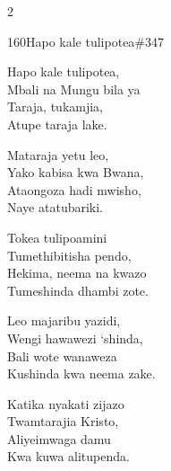 \documentclass{article}
\begin{document}
\begin{multicols}{2}
\begin{hymn}{160}{Hapo kale tulipotea}{\#347}
\begin{stanza}
Hapo kale tulipotea,\\
Mbali na Mungu bila ya\\
Taraja, tukamjia,\\
Atupe taraja lake.
\end{stanza}
\begin{chorus}
Mataraja yetu leo,\\
Yako kabisa kwa Bwana,\\
Ataongoza hadi mwisho,\\
Naye atatubariki.
\end{chorus}
\begin{stanza}
Tokea tulipoamini\\
Tumethibitisha pendo,\\
Hekima, neema na kwazo\\
Tumeshinda dhambi zote.
\end{stanza}
\begin{stanza}
Leo majaribu yazidi,\\
Wengi hawawezi `shinda,\\
Bali wote wanaweza\\
Kushinda kwa neema zake.
\end{stanza}
\begin{stanza}
Katika nyakati zijazo\\
Twamtarajia Kristo,\\
Aliyeimwaga damu\\
Kwa kuwa alitupenda.
\end{stanza}
\end{hymn}


\end{multicols}
\end{document}

